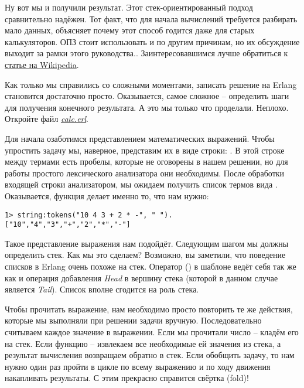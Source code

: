 Ну вот мы и получили результат.
Этот стек\--ориентированный подход сравнительно надёжен.
Тот факт, что для начала вычислений требуется разбирать мало данных, объясняет почему этот способ годится даже для старых калькуляторов.
ОПЗ стоит использовать и по другим причинам, но их обсуждение выходит за рамки этого руководства..
Заинтересовавшимся лучше обратиться к \href{http://en.wikipedia.org/wiki/Reverse_Polish_notation}{статье на Wikipedia}.

Как только мы справились со сложными моментами, записать решение на Erlang становится достаточно просто.
Оказывается, самое сложное \--- определить шаги для получения конечного результата.
А это мы только что проделали.
Неплохо.
Откройте файл \emph{\href{http://learnyousomeerlang.com/static/erlang/calc.erl}{calc.erl}}.

Для начала озаботимся представлением математических выражений.
Чтобы упростить задачу мы, наверное, представим их в виде строки: .
В этой строке между термами есть пробелы, которые не оговорены в нашем решении, но для работы простого лексического анализатора они необходимы.
После обработки входящей строки анализатором, мы ожидаем получить список термов вида \ops{[''10'',''4'',''3'',''+'',''2'',''*'',''-'']}.
Оказывается, функция  делает именно то, что нам нужно:
\begin{lstlisting}[style=erlang]
1> string:tokens("10 4 3 + 2 * -", " ").
["10","4","3","+","2","*","-"]
\end{lstlisting}

Такое представление выражения нам подойдёт.
Следующим шагом мы должны определить стек.
Как мы это сделаем?
Возможно, вы заметили, что поведение списков в Erlang очень похоже на стек.
Оператор (\ops{|}) в шаблоне  ведёт себя так же как и операция добавления \emph{Head} в вершину стека (которой в данном случае является \emph{Tail}).
Список вполне сгодится на роль стека.

Чтобы прочитать выражение, нам необходимо просто повторить те же действия, которые мы выполняли при решении задачи вручную.
Последовательно считываем каждое значение в выражении.
Если мы прочитали число \--- кладём его на стек.
Если функцию \--- извлекаем все необходимые ей значения из стека, а результат вычисления возвращаем обратно в стек.
Если обобщить задачу, то нам нужно один раз пройти в цикле по всему выражению и по ходу движения накапливать результаты.
С этим прекрасно справится свёртка (fold)!

